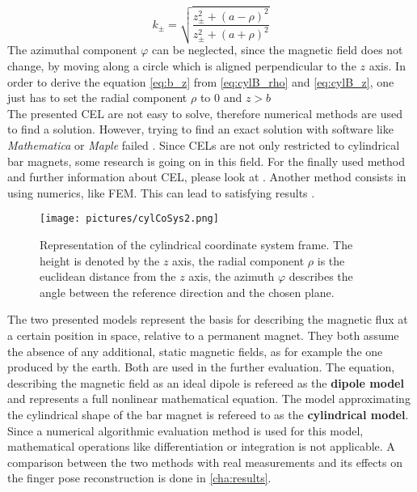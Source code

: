 \begin{equation*}
k_{\pm} = \sqrt{\frac{z_{\pm}^2 + (a-\rho)^2}{z_{\pm}^2 + (a+\rho)^2}}
\end{equation*}
The azimuthal component $ \varphi $ can be neglected, since the magnetic field does not change, by moving along a circle which is aligned perpendicular to the $ z $ axis. In order to derive the equation \ref{eq:b_z} from \ref{eq:cylB_rho} and \ref{eq:cylB_z}, one just has to set the radial component $ \rho $ to 0 and $ z > b $\\
The presented \ac{CEL} are not easy to solve, therefore numerical methods are used to find a solution. However, trying to find an exact solution with software like \textit{Mathematica} or \textit{Maple} failed \cite{camacho2013alternative}. Since \acp{CEL} are not only restricted to cylindrical bar magnets, some research is going on in this field. For the finally used method and further information about \ac{CEL}, please look at \cite{derby2010cylindrical}. Another method consists in using numerics, like \ac{FEM}. This can lead to satisfying results \cite{mladenovic2009magnetic}.\\
\begin{figure}[b]
\centering
\texttt{[image: pictures/cylCoSys2.png]}
\caption[Cylindrical coordinate frame]{Representation of the cylindrical coordinate system frame. The height is denoted by the $ z $ axis, the radial component $ \rho $ is the euclidean distance from the $ z $ axis, the azimuth $ \varphi $ describes the angle between the reference direction and the chosen plane. \cite{derby2010cylindrical}}
\label{fig:cylCoSys}
\end{figure}
The two presented models represent the basis for describing the magnetic flux at a certain position in space, relative to a permanent magnet. They both assume the absence of any additional, static magnetic fields, as for example the one produced by the earth. Both are used in the further evaluation. The equation, describing the magnetic field as an ideal dipole is refereed as the \textbf{dipole model} and represents a full nonlinear mathematical equation. The model approximating the cylindrical shape of the bar magnet is refereed to as the \textbf{cylindrical model}. Since a numerical algorithmic evaluation method is used for this model, mathematical operations like differentiation or integration is not applicable. A comparison between the two methods with real measurements and its effects on the finger pose reconstruction is done in \ref{cha:results}.

\FloatBarrier